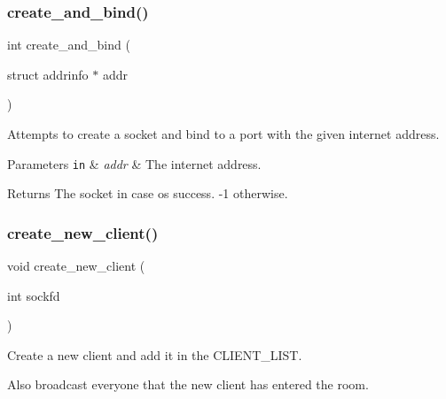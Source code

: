 \subsubsection{\texorpdfstring{create\+\_\+and\+\_\+bind()}{create\_and\_bind()}}
{\footnotesize\ttfamily int create\+\_\+and\+\_\+bind (\begin{DoxyParamCaption}\item[{struct addrinfo $\ast$}]{addr }\end{DoxyParamCaption})}



Attempts to create a socket and bind to a port with the given internet address. 


\begin{DoxyParams}[1]{Parameters}
\mbox{\tt in}  & {\em addr} & The internet address.\\
\hline
\end{DoxyParams}
\begin{DoxyReturn}{Returns}
The socket in case os success. {\ttfamily -\/1} otherwise. 
\end{DoxyReturn}
\mbox{\label{zip-zop-server_8c_ab9a14cd690eac9781dd224e034fbd01d}} 
\subsubsection{\texorpdfstring{create\+\_\+new\+\_\+client()}{create\_new\_client()}}
{\footnotesize\ttfamily void create\+\_\+new\+\_\+client (\begin{DoxyParamCaption}\item[{int}]{sockfd }\end{DoxyParamCaption})}



Create a new client and add it in the {\ttfamily C\+L\+I\+E\+N\+T\+\_\+\+L\+I\+ST}. 

Also broadcast everyone that the new client has entered the room.


